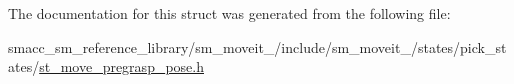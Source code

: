 The documentation for this struct was generated from the following file\+:\begin{DoxyCompactItemize}
\item 
smacc\+\_\+sm\+\_\+reference\+\_\+library/sm\+\_\+moveit\+\_/include/sm\+\_\+moveit\+\_/states/pick\+\_\+states/\hyperlink{4_2include_2sm__moveit__4_2states_2pick__states_2st__move__pregrasp__pose_8h}{st\+\_\+move\+\_\+pregrasp\+\_\+pose.\+h}\end{DoxyCompactItemize}
